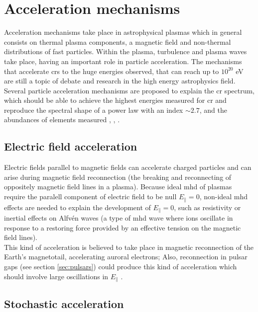 \documentclass[main.tex]{subfiles}
\begin{document}
\section{Acceleration mechanisms}

Acceleration mechanisms take place in astrophysical plasmas which in general consists on thermal plasma components, a magnetic field and non-thermal distributions of fast particles. Within the plasma, turbulence and plasma waves take place, having an important role in particle acceleration.
The mechanisms that accelerate \glspl{cr} to the huge energies observed, that can reach up to $10^{20}$ eV are still a topic of debate and research in the high energy astrophysics field. Several particle acceleration mechanisms are proposed to explain the \gls{cr} spectrum, which should be able to achieve the highest energies measured for \gls{cr} and reproduce the spectral shape of a power law with an index $\sim 2.7$, and the abundances of elements measured \cite{Hillas:1985is}, \cite{2008particleaccelerationmech}, \cite{2009accelerationmech}.

\subsection{Electric field acceleration}

Electric fields parallel to magnetic fields can accelerate charged particles and can arise during magnetic field reconnection (the breaking and reconnecting of oppositely magnetic field lines in a plasma). Because ideal \gls{mhd} of plasmas require the paralell component of electric field to be null $E_{\parallel} = 0 $, non-ideal \gls{mhd} effects are needed to explain the development of $E_{\parallel} = 0$, such as resistivity or inertial effects on Alfvén waves (a type of \gls{mhd} wave where ions oscillate in response to a restoring force provided by an effective tension on the magnetic field lines).\\
This kind of acceleration is believed to take place in magnetic reconnection of the Earth's magnetotail, accelerating auroral electrons; Also, reconnection in pulsar gaps (see section \ref{sec:pulsars}) could produce this kind of acceleration which should involve large oscillations in $E_{\parallel}$ \cite{2009accelerationmech}. 


\subsection{Stochastic acceleration}
\end{document}
